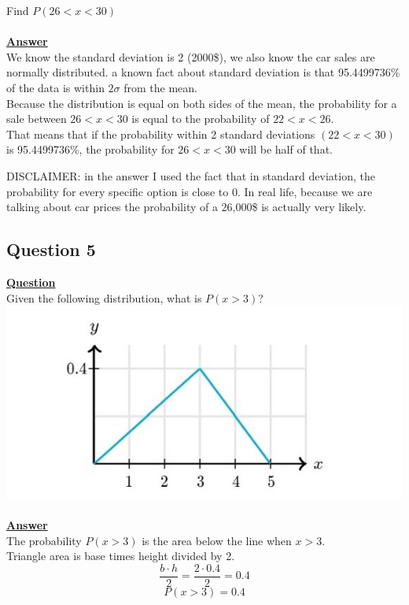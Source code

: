 \documentclass[a4, 12pt,titlepage]{scrartcl}
\begin{document}
 Find $P(26<x<30)$\\
 \smallskip\\
 \textbf{\underline{Answer}}\\
We know the standard deviation is 2 (2000\$), we also know the car sales are normally distributed. a known fact about standard deviation is that 95.4499736\% of the data is within $2\sigma$ from the mean.\\
Because the distribution is equal on both sides of the mean, the probability for a sale between $26<x<30$ is equal to the probability of $22<x<26$.\\
That means that if the probability within 2 standard deviations $(22<x<30)$ is 95.4499736\%, the probability for $26<x<30$ will be half of that.\\
\begin{center}
\end{center}
DISCLAIMER: in the answer I used the fact that in standard deviation, the probability for every specific option is close to 0.
In real life, because we are talking about car prices the probability of a 26,000\$ is actually very likely.
\newpage

\subsection{Question 5}
\textbf{\underline{Question}}\\
Given the following distribution, what is $P(x>3)$?\\
\includegraphics{DSgraph1.jpg}\\
\smallskip\\
\textbf{\underline{Answer}}\\
The probability $P(x>3)$ is the area below the line when $x>3$.\\
Triangle area is base times height divided by 2.\[
\frac{b\cdot h}{2}=\frac{2\cdot 0.4}{2}=0.4
\]
\[
\boxed{P(x>3)=0.4}
\]
 \newpage
\end{document}
